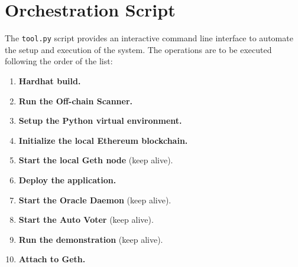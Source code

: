 \section{Orchestration Script}

The \texttt{tool.py} script provides an interactive command line interface to automate the setup and execution of the system.
The operations are to be executed following the order of the list:

\begin{enumerate}
	\item \textbf{Hardhat build.}
	
	\item \textbf{Run the Off-chain Scanner.} %
	
	\item \textbf{Setup the Python virtual environment.} %
	
	\item \textbf{Initialize the local Ethereum blockchain.} %
	
	\item \textbf{Start the local Geth node} (keep alive). %
	
	\item \textbf{Deploy the application.} %
	
	\item \textbf{Start the Oracle Daemon} (keep alive). %
	
	\item \textbf{Start the Auto Voter} (keep alive). %
	
	\item \textbf{Run the demonstration} (keep alive). %
	
	\item \textbf{Attach to Geth.} %
\end{enumerate}

